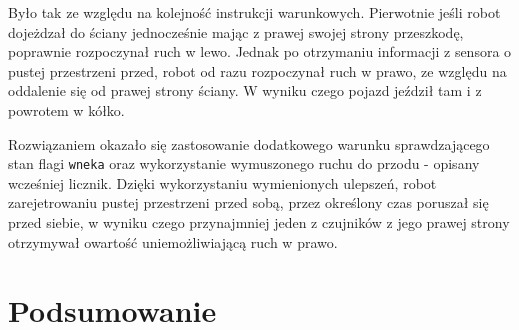 \documentclass{report}
\begin{document}
Było tak ze względu na kolejność instrukcji warunkowych. Pierwotnie jeśli robot dojeżdzał do ściany jednocześnie mając z prawej swojej strony przeszkodę, poprawnie rozpoczynał ruch w lewo. Jednak po otrzymaniu informacji z sensora o pustej przestrzeni przed, robot od razu rozpoczynał ruch w prawo, ze względu na oddalenie się od prawej strony ściany. W wyniku czego pojazd jeździł tam i z powrotem w kółko. 

Rozwiązaniem okazało się zastosowanie dodatkowego warunku sprawdzającego stan flagi \texttt{wneka} oraz wykorzystanie wymuszonego ruchu do przodu - opisany wcześniej licznik. Dzięki wykorzystaniu wymienionych ulepszeń, robot zarejetrowaniu pustej przestrzeni przed sobą, przez określony czas poruszał się przed siebie, w wyniku czego przynajmniej jeden z czujników z jego prawej strony otrzymywał owartość uniemożliwiającą ruch w prawo. 


\section{\LARGE Podsumowanie}
%
%
\end{document}
